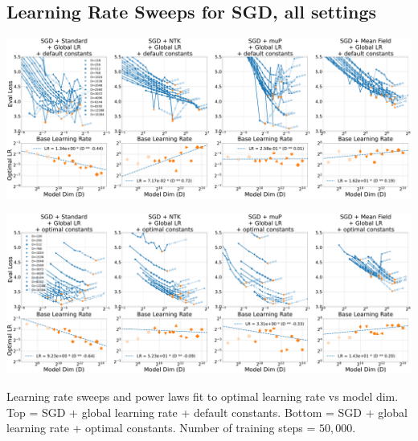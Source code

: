\documentclass{article}
\theoremstyle{plain}
\theoremstyle{definition}
\theoremstyle{remark}
\begin{document}
\clearpage
\thispagestyle{plain}
\begin{SidewaysFigure}
\subsection{Learning Rate Sweeps for SGD, all settings}
\label{sec:app_lr_sweeps_sgd}
\vspace{12pt}
\includegraphics[width=0.98\linewidth]{icml2024/figures/lr_sweeps/appendix/sgd/sgd+50k_steps.pdf}

\figvspace

\includegraphics[width=0.98\linewidth]{icml2024/figures/lr_sweeps/appendix/sgd/sgd+50k_steps_optimal_constants_only.pdf}
\caption{Learning rate sweeps and power laws fit to optimal learning rate vs model dim. Top = SGD + global learning rate + default constants. Bottom = SGD + global learning rate + optimal constants. Number of training steps = $50{,}000$.}
\end{SidewaysFigure}
\clearpage
\end{document}
